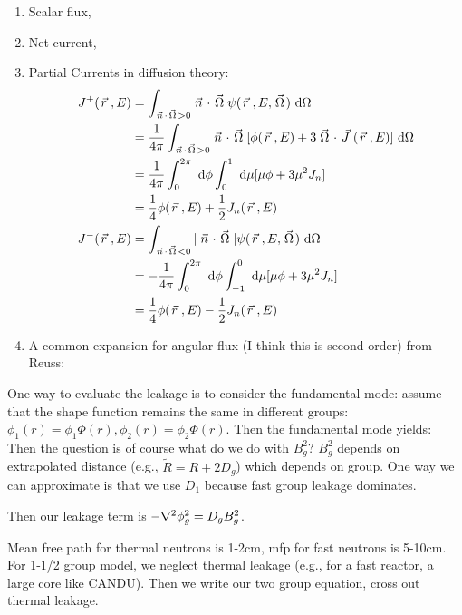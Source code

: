 \documentclass{school-22.211-notes}
\begin{document}
\clearpage
{}
\begin{enumerate}
\item Scalar flux, 
\item Net current,
\item Partial Currents in diffusion theory:
  \begin{align}
    J^+(\left.\vec{r}\right., E) &= \int_{\left.\vec{n}\right. \cdot \left.\vec{\Omega}\right. > 0} \left.\vec{n}\right. \cdot \left.\vec{\Omega}\right. \psi(\left.\vec{r}\right., E, \left.\vec{\Omega}\right.) \mbox{ }\mathrm{d} \Omega \\
    &= \frac{1}{4\pi} \int_{\left.\vec{n}\right. \cdot \left.\vec{\Omega}\right. > 0} \left.\vec{n}\right. \cdot \left.\vec{\Omega}\right. [\phi(\left.\vec{r}\right., E) + 3 \left.\vec{\Omega}\right. \cdot \left.\vec{J}\right.(\left.\vec{r}\right., E) ] \mbox{ }\mathrm{d} \Omega \\
    &= \frac{1}{4\pi} \int_0^{2\pi} \mbox{ }\mathrm{d} \phi \int_0^1 \mbox{ }\mathrm{d} \mu [ \mu \phi + 3 \mu^2 J_n] \\
    &= \frac{1}{4} \phi(\left.\vec{r}\right., E) + \frac{1}{2} J_n (\left.\vec{r}\right., E) \\
    J^-(\left.\vec{r}\right., E) &= \int_{\left.\vec{n}\right. \cdot \left.\vec{\Omega}\right. < 0} |\left.\vec{n}\right. \cdot \left.\vec{\Omega}\right.| \psi(\left.\vec{r}\right., E, \left.\vec{\Omega}\right.) \mbox{ }\mathrm{d} \Omega  \\
    &= -\frac{1}{4\pi} \int_0^{2\pi} \mbox{ }\mathrm{d} \phi \int_{-1}^0 \mbox{ }\mathrm{d} \mu [ \mu \phi + 3 \mu^2 J_n] \\
    &= \frac{1}{4} \phi(\left.\vec{r}\right., E) - \frac{1}{2} J_n (\left.\vec{r}\right., E) 
  \end{align}

\item A common expansion for angular flux (I think this is second order) from Reuss: 
\eqn{    \int_{4\pi} \psi \dOmega &= \phi }
\end{enumerate}




\clearpage
{}
One way to evaluate the leakage is to consider the fundamental mode: assume that the shape function remains the same in different groups: $\phi_1(r) = \phi_1 \Phi (r), \phi_2 (r) = \phi_2 \Phi(r)$. Then the fundamental mode yields: 
Then the question is of course what do we do with $B_g^2$? $B_g^2$ depends on extrapolated distance (e.g., $\tilde{R} = R + 2D_g$) which depends on group. One way we can approximate is that we use $D_1$ because fast group leakage dominates. 

Then our leakage term is $-\nabla^2 \phi_g^2 = D_g B_g^2$. 


\clearpage
{} 
Mean free path for thermal neutrons is 1-2cm, mfp for fast neutrons is 5-10cm. For 1-1/2 group model, we neglect thermal leakage (e.g., for a fast reactor, a large core like CANDU). Then we write our two group equation, cross out thermal leakage. 
\end{document}
